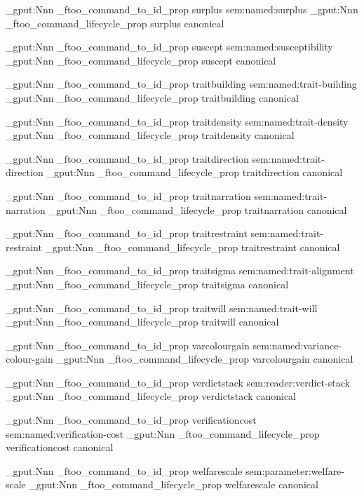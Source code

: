 \prop_gput:Nnn \g_ftoo_command_to_id_prop { surplus } { sem:named:surplus }
\prop_gput:Nnn \g_ftoo_command_lifecycle_prop { surplus } { canonical }


\prop_gput:Nnn \g_ftoo_command_to_id_prop { suscept } { sem:named:susceptibility }
\prop_gput:Nnn \g_ftoo_command_lifecycle_prop { suscept } { canonical }


\prop_gput:Nnn \g_ftoo_command_to_id_prop { traitbuilding } { sem:named:trait-building }
\prop_gput:Nnn \g_ftoo_command_lifecycle_prop { traitbuilding } { canonical }


\prop_gput:Nnn \g_ftoo_command_to_id_prop { traitdensity } { sem:named:trait-density }
\prop_gput:Nnn \g_ftoo_command_lifecycle_prop { traitdensity } { canonical }


\prop_gput:Nnn \g_ftoo_command_to_id_prop { traitdirection } { sem:named:trait-direction }
\prop_gput:Nnn \g_ftoo_command_lifecycle_prop { traitdirection } { canonical }


\prop_gput:Nnn \g_ftoo_command_to_id_prop { traitnarration } { sem:named:trait-narration }
\prop_gput:Nnn \g_ftoo_command_lifecycle_prop { traitnarration } { canonical }


\prop_gput:Nnn \g_ftoo_command_to_id_prop { traitrestraint } { sem:named:trait-restraint }
\prop_gput:Nnn \g_ftoo_command_lifecycle_prop { traitrestraint } { canonical }


\prop_gput:Nnn \g_ftoo_command_to_id_prop { traitsigma } { sem:named:trait-alignment }
\prop_gput:Nnn \g_ftoo_command_lifecycle_prop { traitsigma } { canonical }


\prop_gput:Nnn \g_ftoo_command_to_id_prop { traitwill } { sem:named:trait-will }
\prop_gput:Nnn \g_ftoo_command_lifecycle_prop { traitwill } { canonical }


\prop_gput:Nnn \g_ftoo_command_to_id_prop { varcolourgain } { sem:named:variance-colour-gain }
\prop_gput:Nnn \g_ftoo_command_lifecycle_prop { varcolourgain } { canonical }


\prop_gput:Nnn \g_ftoo_command_to_id_prop { verdictstack } { sem:reader:verdict-stack }
\prop_gput:Nnn \g_ftoo_command_lifecycle_prop { verdictstack } { canonical }


\prop_gput:Nnn \g_ftoo_command_to_id_prop { verificationcost } { sem:named:verification-cost }
\prop_gput:Nnn \g_ftoo_command_lifecycle_prop { verificationcost } { canonical }


\prop_gput:Nnn \g_ftoo_command_to_id_prop { welfarescale } { sem:parameter:welfare-scale }
\prop_gput:Nnn \g_ftoo_command_lifecycle_prop { welfarescale } { canonical }


